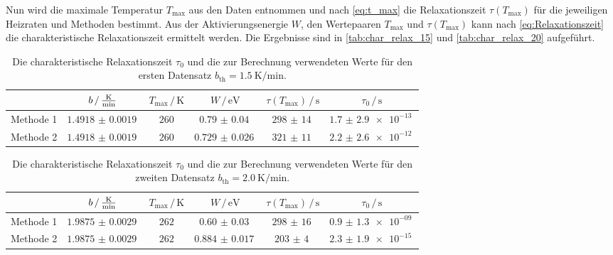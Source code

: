\FloatBarrier
Nun wird die maximale Temperatur $T_\text{max}$ aus den Daten entnommen und nach \autoref{eq:t_max} die Relaxationszeit $\tau(T_\text{max})$ für die jeweiligen Heizraten und Methoden bestimmt.
Aus der Aktivierungsenergie $W$, den Wertepaaren $T_\text{max}$ und $\tau(T_\text{max})$ kann nach \autoref{eq:Relaxationszeit} die charakteristische Relaxationszeit ermittelt werden.
Die Ergebnisse sind in \autoref{tab:char_relax_15} und \autoref{tab:char_relax_20} aufgeführt.
\begin{table}
    \centering
    \caption{Die charakteristische Relaxationszeit $\tau_0$ und die zur Berechnung verwendeten Werte für den ersten Datensatz $b_\text{th} = \SI{1.5}{\kelvin \per \minute}$.}
    \label{tab:char_relax_15}
    \begin{tabular}{c | c c c c | c}
        \toprule
        & $b \,/\, \si{\frac{\kelvin}{\minute}}$ & $T_\text{max} \,/\, \si{\kelvin}$ & $W \,/\, \si{\electronvolt}$ & $\tau(T_\text{max}) \,/\, \si{\second}$ & $\tau_0 \,/\, \si{\second}$ \\
        \midrule
        Methode 1 & $\SI{1.4918(19)}{}$ & $260$ & $\SI{0.79(4)}{}$ & $\SI{298(14)}{}$ & $\SI{1.7(29)e-13}{}$ \\
        Methode 2 & $\SI{1.4918(19)}{}$ & $260$ & $\SI{0.729(26)}{}$ & $\SI{321(11)}{}$ & $\SI{2.2(26)e-12}{}$ \\
        \bottomrule
    \end{tabular}
\end{table}

\begin{table}
    \centering
    \caption{Die charakteristische Relaxationszeit $\tau_0$ und die zur Berechnung verwendeten Werte für den zweiten Datensatz $b_\text{th} = \SI{2.0}{\kelvin \per \minute}$.}
    \label{tab:char_relax_20}
    \begin{tabular}{c | c c c c | c}
        \toprule
        & $b \,/\, \si{\frac{\kelvin}{\minute}}$ & $T_\text{max} \,/\, \si{\kelvin}$ & $W \,/\, \si{\electronvolt}$ & $\tau(T_\text{max}) \,/\, \si{\second}$ & $\tau_0 \,/\, \si{\second}$ \\
        \midrule
        Methode 1 & $\SI{1.9875(29)}{}$ & $262$ & $\SI{0.60(3)}{}$ & $\SI{298(16)}{}$ & $\SI{0.9(13)e-09}{}$ \\
        Methode 2 & $\SI{1.9875(29)}{}$ & $262$ & $\SI{0.884(17)}{}$ & $\SI{203(4)}{}$ & $\SI{2.3(19)e-15}{}$ \\
        \bottomrule
    \end{tabular}
\end{table}
\FloatBarrier

